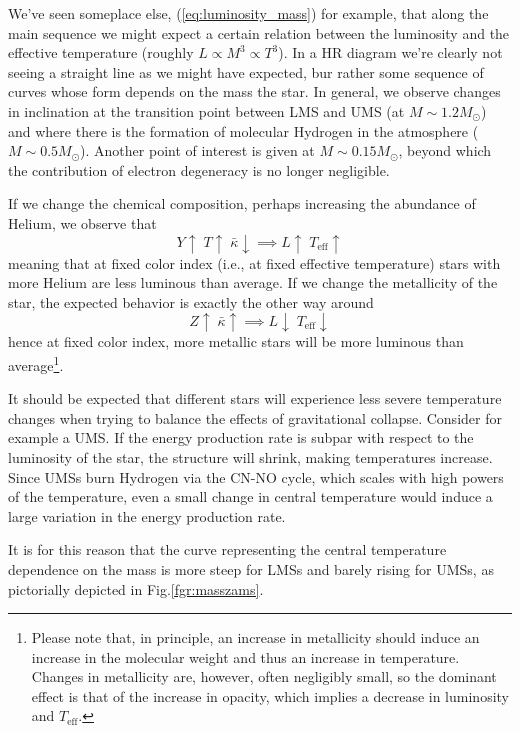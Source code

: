 \par We've seen someplace else, (\ref{eq:luminosity_mass}) for example, that along the main sequence we might expect a certain relation between the luminosity and the effective temperature (roughly $L\propto M^{3}\propto T^{3}$). In a HR diagram we're clearly not seeing a straight line as we might have expected, bur rather some sequence of curves whose form depends on the mass the star. In general, we observe changes in inclination at the transition point between LMS and UMS (at $M\sim 1.2M_{\odot}$) and where there is the formation of molecular Hydrogen in the atmosphere ($M\sim 0.5M_{\odot}$). Another point of interest is given at $M\sim 0.15M_{\odot}$, beyond which the contribution of electron degeneracy is no longer negligible.
\par If we change the chemical composition, perhaps increasing the abundance of Helium, we observe that 
\begin{equation*}
    Y \uparrow \; T\uparrow\; \bar{\kappa}\downarrow \implies L\uparrow\; T_{\text{eff}}\uparrow
\end{equation*}
meaning that at fixed color index (i.e., at fixed effective temperature) stars with more Helium are less luminous than average. If we change the metallicity of the star, the expected behavior is exactly the other way around
\begin{equation*}
    Z\uparrow\; \bar{\kappa}\uparrow \implies L\downarrow\;T_{\text{eff}}\downarrow
\end{equation*}
hence at fixed color index, more metallic stars will be more luminous than average\footnote{Please note that, in principle, an increase in metallicity should induce an increase in the molecular weight and thus an increase in temperature. Changes in metallicity are, however, often negligibly small, so the dominant effect is that of the increase in opacity, which implies a decrease in luminosity and $T_{\text{eff}}$.}.
\par It should be expected that different stars will experience less severe temperature changes when trying to balance the effects of gravitational collapse. Consider for example a UMS. If the energy production rate is subpar with respect to the luminosity of the star, the structure will shrink, making temperatures increase. Since UMSs burn Hydrogen via the CN-NO cycle, which scales with high powers of the temperature, even a small change in central temperature would induce a large variation in the energy production rate.
\par It is for this reason that the curve representing the central temperature dependence on the mass is more steep for LMSs and barely rising for UMSs, as pictorially depicted in Fig.\ref{fgr:masszams}.
